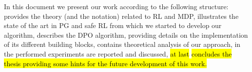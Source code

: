 \newline
In this document we present our work according to the following structure:  provides the theory (and the notation) related to \acf{RL} and \acf{MDP},  illustrates the state of the art in \acf{PG} and safe \ac{RL} from which we started to develop our algorithm,  describes the \ac{DPO} algorithm, providing details on the implementation of its different building blocks,  contains theoretical analysis of our approach, in  the performed experiments are reported and discussed, \hl{at last}  \hl{concludes the thesis providing some hints for the future development of this work.}